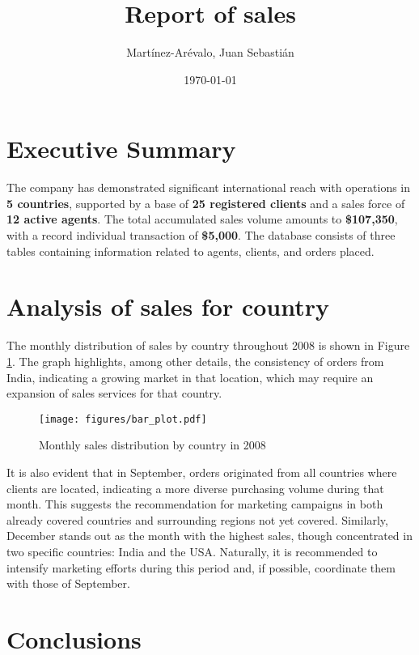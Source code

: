 \documentclass{article}
\title{Report of sales}
\author{Martínez-Arévalo, Juan Sebastián}
\date{\today}
\begin{document}
\maketitle

\section*{Executive Summary}
The company has demonstrated significant international reach with operations in \textbf{5 countries}, supported by a base of \textbf{25 registered clients} and a sales force of \textbf{12 active agents}. The total accumulated sales volume amounts to \textbf{\$107,350}, with a record individual transaction of \textbf{\$5,000}. The database consists of three tables containing information related to agents, clients, and orders placed.

\section*{Analysis of sales for country}

The monthly distribution of sales by country throughout 2008 is shown in Figure \ref{fig:sales_by_country}. The graph highlights, among other details, the consistency of orders from India, indicating a growing market in that location, which may require an expansion of sales services for that country.

\begin{figure}[!h]
    \centering
    \texttt{[image: figures/bar\_plot.pdf]}
    \caption{Monthly sales distribution by country in 2008}
    \label{fig:sales_by_country}
\end{figure}

It is also evident that in September, orders originated from all countries where clients are located, indicating a more diverse purchasing volume during that month. This suggests the recommendation for marketing campaigns in both already covered countries and surrounding regions not yet covered. Similarly, December stands out as the month with the highest sales, though concentrated in two specific countries: India and the USA. Naturally, it is recommended to intensify marketing efforts during this period and, if possible, coordinate them with those of September.

\section*{Conclusions}
\end{document}
